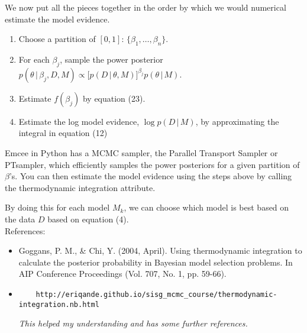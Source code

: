 \documentclass[11pt]{article}
\begin{document}
We now put all the pieces together in the order by which we would numerical estimate the model evidence. 

\begin{enumerate}
	\item Choose a partition of $[0,1]$: $\{\beta_1,\dots,\beta_n\}$.
	\item For each $\beta_j$, sample the power posterior $p(\theta\,|\, \beta_j,D,M) \propto \big[p(D\,|\, \theta,M)\big]^{\beta_j} p(\theta\,|\, M)$.
	\item Estimate $f(\beta_j)$ by equation (23).
	\item Estimate the log model evidence, $\log p(D\,|\, M)$, by approximating the integral in equation (12)
\end{enumerate}
Emcee in Python has a MCMC sampler, the Parallel Transport Sampler or PTsampler, which efficiently samples the power posteriors for a given partition of $\beta$'s.
You can then estimate the model evidence using the steps above by calling the thermodynamic integration attribute.

By doing this for each model $M_k$, we can choose which model is best based on the data $D$ based on equation (4).\\

References:
\begin{itemize}
	\item Goggans, P. M., \& Chi, Y. (2004, April). Using thermodynamic integration to calculate the posterior probability in Bayesian model selection problems. In AIP Conference Proceedings (Vol. 707, No. 1, pp. 59-66).
	\item  \begin{verbatim}
	http://eriqande.github.io/sisg_mcmc_course/thermodynamic-integration.nb.html
	\end{verbatim}
	\textit{This helped my understanding and has some further references.}
\end{itemize}
\end{document}
